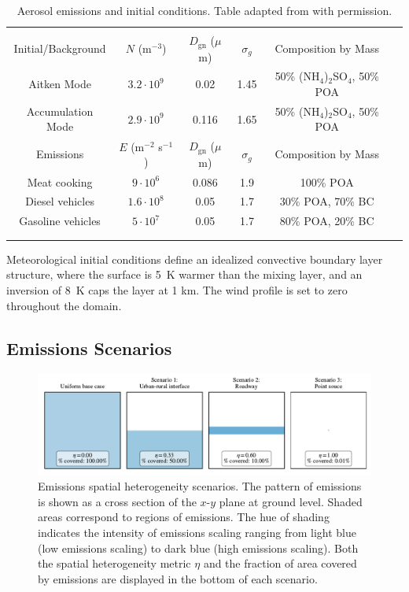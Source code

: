 \documentclass[journal abbreviation, manuscript]{copernicus}
\begin{document}
\begin{table}[!t]
\centering
\caption{Aerosol emissions and initial conditions. Table adapted from \citet{riemer_simulating_2009} with permission.}
\begin{tabular*}{\linewidth}{@{\extracolsep{\fill}} cccccc}
\\[-2ex]\hline 
     \hline \\[-2ex] Initial/Background  & $N$ (m$^{-3}$) & $D_{\text{gn}}$ ($\mu$m) & $\sigma_g$ & Composition by Mass\\
 \midrule
Aitken Mode & $3.2 \cdot 10^9$ & 0.02 & 1.45 & 50\% (NH$_4$)$_2$SO$_4$, 50\% POA\\
Accumulation Mode & $2.9 \cdot 10^9$ & 0.116 & 1.65 & 50\% (NH$_4$)$_2$SO$_4$, 50\% POA\\
\midrule
Emissions & $E$ (m$^{-2}$ s$^{-1}$) & $D_{\text{gn}}$ ($\mu$m) & $\sigma_g$ & Composition by Mass\\
\midrule
Meat cooking & $9 \cdot 10^6$ & 0.086 & 1.9 & 100\% POA\\
Diesel vehicles & $1.6 \cdot 10^8$ & 0.05 & 1.7 & 30\% POA, 70\% BC \\
Gasoline vehicles & $5 \cdot 10^7$ & 0.05 & 1.7 & 80\% POA, 20\% BC \\
\\[-2ex]\hline 
     \hline \\[-2ex]
\end{tabular*}
\label{table:aero_emiss_ics}
\end{table}

Meteorological initial conditions define an idealized
convective boundary layer structure, where the surface is 5~K warmer
than the mixing layer, and an inversion of 8~K caps the layer at 1
km. The wind profile is set to zero throughout the domain.

\subsection{Emissions Scenarios}

\begin{figure}[!t]
	\centering
	\includegraphics[]{figures/SH-scenarios.pdf}
	\caption{Emissions spatial heterogeneity scenarios. The
          pattern of emissions is shown as a cross section of the
          $x$-$y$ plane at ground level. Shaded areas correspond to
          regions of emissions. The hue of shading indicates the
          intensity of emissions scaling ranging from light blue (low
          emissions scaling) to dark blue (high emissions
          scaling). Both the spatial heterogeneity metric $\eta$ and
          the fraction of area covered by emissions are displayed in
          the bottom of each scenario.}
	\label{fig:sh-scenarios}
\end{figure} 
\end{document}
